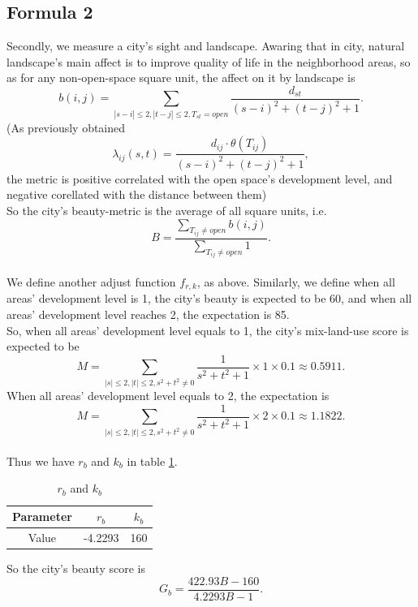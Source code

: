 \subsection{Formula 2}
Secondly, we measure a city's sight and landscape.
Awaring that in city, natural landscape's main affect is to improve quality of life in the neighborhood areas, so as for any non-open-space square unit, the affect on it by landscape is $$ b(i,j) = \sum_{|s-i|\leq 2, |t-j|\leq 2, T_{st}=open} \frac{d_{st}}{(s-i)^2+(t-j)^2+1}. $$
(As previously obtained $$ \lambda_{ij}(s,t) = \frac{d_{ij} \cdot \theta (T_{ij})}{(s-i)^2 + (t-j)^2 + 1}, $$ the metric is positive correlated with the open space's development level, and negative corellated with the distance between them)
\\
So the city's beauty-metric is the average of all square units, i.e. $$ B=\frac{\sum_{T_{ij}\neq open} b(i,j)}{\sum_{T_{ij}\neq open} 1}. $$
\\
We define another adjust function $ f_{r,k} $, as above.
Similarly, we define when all areas' development level is 1, the city's beauty is expected to be 60, and when all areas' development level reaches 2, the expectation is 85.
\\
So, when all areas' development level equals to 1, the city's mix-land-use score is expected to be $$ M=\sum_{|s|\leq 2, |t|\leq 2, s^2+t^2 \neq 0} \frac{1}{s^2+t^2+1} \times 1 \times 0.1 \approx 0.5911. $$
When all areas' development level equals to 2, the expectation is $$ M=\sum_{|s|\leq 2, |t|\leq 2, s^2+t^2 \neq 0} \frac{1}{s^2+t^2+1} \times 2 \times 0.1 \approx 1.1822. $$
\\
Thus we have $ r_b $ and $ k_b $ in table \ref{tab:f2-data}.
\begin{table}[tb]
\centering
  \begin{tabular}{c|cc}
    \hline
    Parameter & $r_b$ & $k_b$ \\
    \hline
    Value & -4.2293 & 160 \\
    \hline
  \end{tabular}
  \caption{$r_b$ and $k_b$}
  \label{tab:f2-data}
\end{table}
So the city's beauty score is $$ G_b=\frac{422.93B-160}{4.2293B-1}. $$
\\
